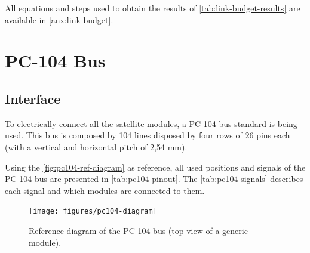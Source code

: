 All equations and steps used to obtain the results of \autoref{tab:link-budget-results} are available in \autoref{anx:link-budget}.

\section{PC-104 Bus}

\subsection{Interface}

To electrically connect all the satellite modules, a PC-104 bus standard is being used. This bus is composed by 104 lines disposed by four rows of 26 pins each (with a vertical and horizontal pitch of 2,54 mm).

Using the \autoref{fig:pc104-ref-diagram} as reference, all used positions and signals of the PC-104 bus are presented in \autoref{tab:pc104-pinout}. The \autoref{tab:pc104-signals} describes each signal and which modules are connected to them.

\begin{figure}[!ht]
    \begin{center}
        \texttt{[image: figures/pc104-diagram]}
        \caption{Reference diagram of the PC-104 bus (top view of a generic module).}
        \label{fig:pc104-ref-diagram}
    \end{center}
\end{figure}

